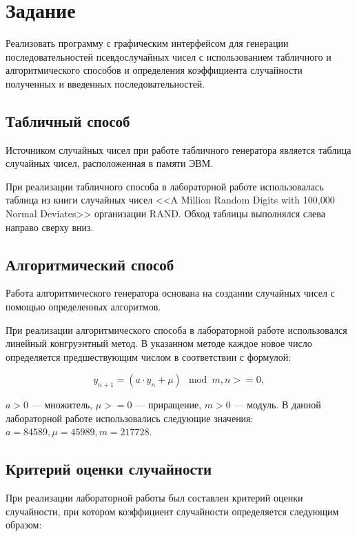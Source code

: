 \chapter{Задание}

Реализовать программу с графическим интерфейсом для генерации последовательностей псевдослучайных чисел с использованием табличного и алгоритмического способов и определения коэффициента случайности полученных и введенных последовательностей.

\section{Табличный способ}

Источником случайных чисел при работе табличного генератора является таблица случайных чисел, расположенная в памяти ЭВМ. 

При реализации табличного способа в лабораторной работе использовалась таблица из книги случайных чисел <<A Million Random Digits with 100,000 Normal Deviates>> организации RAND. Обход таблицы выполнялся слева направо сверху вниз.

\section{Алгоритмический способ}

Работа алгоритмического генератора основана на создании случайных чисел с помощью определенных алгоритмов.

При реализации алгоритмического способа в лабораторной работе использовался линейный конгруэнтный метод. В указанном методе каждое новое число определяется предшествующим числом в соответствии с формулой:

\begin{equation}
	y_{n + 1} = (a \cdot y_{n} + \mu)\mod m, n >= 0,
\end{equation}

 $a > 0$ --- множитель, $\mu >= 0$ --- приращение, $m > 0$ --- модуль. В данной лабораторной работе использовались следующие значения: $a = 84589, \mu = 45989, m = 217728$.

\section{Критерий оценки случайности}

При реализации лабораторной работы был составлен критерий оценки случайности, при котором коэффициент случайности определяется следующим образом:

